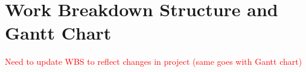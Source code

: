 \documentclass[main.tex]{subfiles}
\begin{document}








\section{Work Breakdown Structure and Gantt Chart}
\textcolor{red}{Need to update WBS to reflect changes in project (same goes with Gantt chart)}
\end{document}
